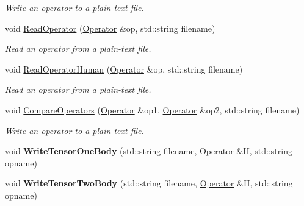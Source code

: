 \begin{DoxyCompactItemize}
\begin{DoxyCompactList}\small\item\em Write an operator to a plain-\/text file. \end{DoxyCompactList}\item 
\hypertarget{classReadWrite_a20d388592af9ebce8f7e2dc78f9c5d76}{void \hyperlink{classReadWrite_a20d388592af9ebce8f7e2dc78f9c5d76}{Read\-Operator} (\hyperlink{classOperator}{Operator} \&op, std\-::string filename)}\label{classReadWrite_a20d388592af9ebce8f7e2dc78f9c5d76}

\begin{DoxyCompactList}\small\item\em Read an operator from a plain-\/text file. \end{DoxyCompactList}\item 
\hypertarget{classReadWrite_a3a9cfd656a845209fa1ed21e0f4880aa}{void \hyperlink{classReadWrite_a3a9cfd656a845209fa1ed21e0f4880aa}{Read\-Operator\-Human} (\hyperlink{classOperator}{Operator} \&op, std\-::string filename)}\label{classReadWrite_a3a9cfd656a845209fa1ed21e0f4880aa}

\begin{DoxyCompactList}\small\item\em Read an operator from a plain-\/text file. \end{DoxyCompactList}\item 
\hypertarget{classReadWrite_af5fa5dfa318b8e9c30d7a5caa0f12673}{void \hyperlink{classReadWrite_af5fa5dfa318b8e9c30d7a5caa0f12673}{Compare\-Operators} (\hyperlink{classOperator}{Operator} \&op1, \hyperlink{classOperator}{Operator} \&op2, std\-::string filename)}\label{classReadWrite_af5fa5dfa318b8e9c30d7a5caa0f12673}

\begin{DoxyCompactList}\small\item\em Write an operator to a plain-\/text file. \end{DoxyCompactList}\item 
\hypertarget{classReadWrite_aefac9a6372a3e99c35dbf276165104a8}{void {\bfseries Write\-Tensor\-One\-Body} (std\-::string filename, \hyperlink{classOperator}{Operator} \&H, std\-::string opname)}\label{classReadWrite_aefac9a6372a3e99c35dbf276165104a8}

\item 
\hypertarget{classReadWrite_a27cf4cfcc0add75e2e210a542802ffe3}{void {\bfseries Write\-Tensor\-Two\-Body} (std\-::string filename, \hyperlink{classOperator}{Operator} \&H, std\-::string opname)}\label{classReadWrite_a27cf4cfcc0add75e2e210a542802ffe3}


\end{DoxyCompactItemize}
